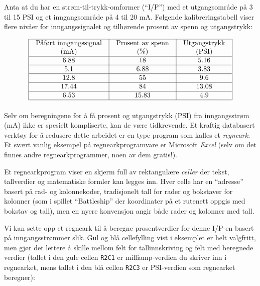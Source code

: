 
Anta at du har en strøm-til-trykk-omformer (``I/P'') med et utgangsområde på 3 til 15 PSI og et inngangsområde på 4 til 20 mA. Følgende kalibreringstabell viser flere nivåer for inngangssignalet og tilhørende prosent av spenn og utgangstrykk:


$$\vbox{\offinterlineskip
\halign{\strut
\vrule \quad\hfil # \ \hfil & 
\vrule \quad\hfil # \ \hfil & 
\vrule \quad\hfil # \ \hfil \vrule \cr
\noalign{\hrule}
%
Påført inngangssignal & Prosent av spenn & Utgangstrykk \cr
%
(mA) & (\%) & (PSI) \cr
%
\noalign{\hrule}
%
6.88 & 18 & 5.16 \cr
%
\noalign{\hrule}
%
5.1 & 6.88 & 3.83 \cr
%
\noalign{\hrule}
%
12.8 & 55 & 9.6 \cr
%
\noalign{\hrule}
%
17.44 & 84 & 13.08 \cr
%
\noalign{\hrule}
%
6.53 & 15.83 & 4.9 \cr
%
\noalign{\hrule}
} %
}$$ %

Selv om beregningene for å få prosent og utgangstrykk (PSI) fra inngangsstrøm (mA) ikke er spesielt kompliserte, kan de være tidkrevende. Et kraftig databasert verktøy for å redusere dette arbeidet er en type program som kalles et {\it regneark}. Et svært vanlig eksempel på regnearkprogramvare er Microsoft {\it Excel} (selv om det finnes andre regnearkprogrammer, noen av dem gratis!).

Et regnearkprogram viser en skjerm full av rektangulære {\it celler} der tekst, tallverdier og matematiske formler kan legges inn. Hver celle har en ``adresse'' basert på rad- og kolonnekoder, tradisjonelt tall for rader og bokstaver for kolonner (som i spillet ``Battleship'' der koordinater på et rutenett oppgis med bokstav og tall), men en nyere konvensjon angir både rader og kolonner med tall.

Vi kan sette opp et regneark til å beregne prosentverdier for denne I/P-en basert på inngangsstrømmer slik. Gul og blå cellefylling vist i eksemplet er helt valgfritt, men gjør det lettere å skille mellom felt for tallinnskriving og felt med beregnede verdier (tallet i den gule cellen {\tt R2C1} er milliamp-verdien du skriver inn i regnearket, mens tallet i den blå cellen {\tt R2C3} er PSI-verdien som regnearket beregner):

